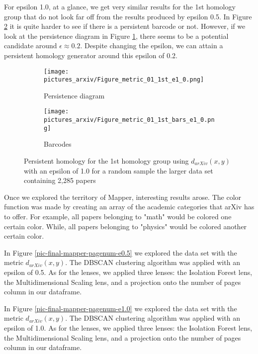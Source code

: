 \documentclass[12pt]{article}
\theoremstyle{definition}
\begin{document}
\par For epsilon 1.0, at a glance, we get very similar results for the 1st homology group that do not look far off from the results produced by epsilon 0.5. In Figure \ref{pic-final-metric_01-1st-bars-e1.0} it is quite harder to see if there is a persistent barcode or not. However, if we look at the persistence diagram in Figure \ref{pic-final-metric_01-1st-e1.0}, there seems to be a potential candidate around $\epsilon\approx 0.2$. Despite changing the epsilon, we can attain a persistent homology generator around this epsilon of 0.2. 

\begin{figure}[h]
\begin{subfigure}{0.5\textwidth}
  \centering
  \texttt{[image: pictures\_arxiv/Figure\_metric\_01\_1st\_e1\_0.png]}
  \caption{Persistence diagram}
  \label{pic-final-metric_01-1st-e1.0}
\end{subfigure}
\begin{subfigure}{0.5\textwidth}
  \centering
  \texttt{[image: pictures\_arxiv/Figure\_metric\_01\_1st\_bars\_e1\_0.png]}
  \caption{Barcodes}
  \label{pic-final-metric_01-1st-bars-e1.0}
\end{subfigure}
\caption{Persistent homology for the 1st homology group using $d_{arXiv}(x,y)$ with an epsilon of 1.0 for a random sample the larger data set containing 2,285 papers}
\label{fig-metric_01-1st-e1.0}
\end{figure}

\par Once we explored the territory of Mapper, interesting results arose. The color function was made by creating an array of the academic categories that arXiv has to offer. For example, all papers belonging to "math" would be colored one certain color. While, all papers belonging to "physics" would be colored another certain color. 

In Figure \ref{pic-final-mapper-pagenum-e0.5} we explored the data set with the metric $d_{arXiv}(x,y)$. The DBSCAN clustering algorithm was applied with an epsilon of 0.5. As for the lenses, we applied three lenses: the Isolation Forest lens, the Multidimensional Scaling lens, and a projection onto the number of pages column in our dataframe. 

In Figure \ref{pic-final-mapper-pagenum-e1.0} we explored the data set with the metric $d_{arXiv}(x,y)$. The DBSCAN clustering algorithm was applied with an epsilon of 1.0. As for the lenses, we applied three lenses: the Isolation Forest lens, the Multidimensional Scaling lens, and a projection onto the number of pages column in our dataframe. 
\end{document}
